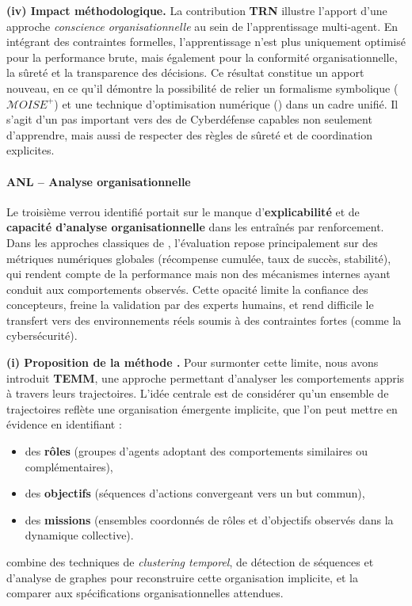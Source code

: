 \medskip
\noindent
\textbf{(iv) Impact méthodologique.}
La contribution \textbf{TRN} illustre l'apport d'une approche \textit{consci\-ence organisationnelle} au sein de l'apprentissage multi-agent.
En intégrant des contraintes formelles, l'apprentissage n'est plus uniquement optimisé pour la performance brute, mais également pour la conformité organisationnelle, la sûreté et la transparence des décisions.
Ce résultat constitue un apport nouveau, en ce qu'il démontre la possibilité de relier un formalisme symbolique ($\mathcal{M}OISE^+$) et une technique d'optimisation numérique () dans un cadre unifié.
Il s'agit d'un pas important vers des  de Cyberdéfense capables non seulement d'apprendre, mais aussi de respecter des règles de sûreté et de coordination explicites.

\paragraph{ANL – Analyse organisationnelle}

Le troisième verrou identifié portait sur le manque d'\textbf{explicabilité} et de \textbf{capacité d'analyse organisationnelle} dans les  entraînés par renforcement.
Dans les approches classiques de , l'évaluation repose principalement sur des métriques numériques globales (récompense cumulée, taux de succès, stabilité), qui rendent compte de la performance mais non des mécanismes internes ayant conduit aux comportements observés.
Cette opacité limite la confiance des concepteurs, freine la validation par des experts humains, et rend difficile le transfert vers des environnements réels soumis à des contraintes fortes (comme la cybersécurité).

\medskip
\noindent
\textbf{(i) Proposition de la méthode .}
Pour surmonter cette limite, nous avons introduit \textbf{TEMM}, une approche permettant d'analyser les comportements appris à travers leurs trajectoires.
L'idée centrale est de considérer qu'un ensemble de trajectoires reflète une organisation émergente implicite, que l'on peut mettre en évidence en identifiant :
\begin{itemize}
  \item des \textbf{rôles} (groupes d'agents adoptant des comportements similaires ou complémentaires),
  \item des \textbf{objectifs} (séquences d'actions convergeant vers un but commun),
  \item des \textbf{missions} (ensembles coordonnés de rôles et d'objectifs observés dans la dynamique collective).
\end{itemize}
 combine des techniques de \textit{clustering temporel}, de détection de séquences et d'analyse de graphes pour reconstruire cette organisation implicite, et la comparer aux spécifications organisationnelles attendues.


